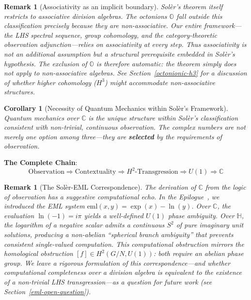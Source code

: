 \documentclass[11pt]{article}
\newtheorem{remark}[theorem]{Remark}
\newtheorem{corollary}[theorem]{Corollary}
\begin{document}
\begin{remark}[Associativity as an implicit boundary]
Sol\`{e}r's theorem itself restricts to associative division algebras. The octonions $\mathbb{O}$ fall outside this classification precisely because they are non-associative. Our entire framework---the LHS spectral sequence, group cohomology, and the category-theoretic observation adjunction---relies on associativity at every step. Thus associativity is not an additional assumption but a structural prerequisite embedded in Sol\`{e}r's hypothesis. The exclusion of $\mathbb{O}$ is therefore automatic: the theorem simply does not apply to non-associative algebras. See Section~\ref{octonionic-h3} for a discussion of whether higher cohomology ($H^3$) might accommodate non-associative structures.
\end{remark}

\begin{corollary}[Necessity of Quantum Mechanics within Sol\`{e}r's Framework]\label{cor:necessity}
Quantum mechanics over $\mathbb{C}$ is the unique structure within Sol\`{e}r's classification consistent with non-trivial, continuous observation. The complex numbers are not merely one option among three---they are \textbf{selected} by the requirements of observation.
\end{corollary}

\textbf{The Complete Chain}:
\[
\boxed{\text{Observation} \Rightarrow \text{Contextuality} \Rightarrow H^2\text{-Transgression} \Rightarrow U(1) \Rightarrow \mathbb{C}}
\]

\begin{remark}[The Sol\`{e}r-EML Correspondence]\label{rem:soler-eml}
The derivation of $\mathbb{C}$ from the logic of observation has a suggestive computational echo. In the Epilogue~\cite{Epilogue}, we introduced the EML system $\text{eml}(x, y) = \exp(x) - \ln(y)$. Over $\mathbb{C}$, the evaluation $\ln(-1) = i\pi$ yields a well-defined $U(1)$ phase ambiguity. Over $\mathbb{H}$, the logarithm of a negative scalar admits a continuous $S^2$ of pure imaginary unit solutions, producing a non-abelian ``spherical branch ambiguity'' that prevents consistent single-valued computation. This computational obstruction mirrors the homological obstruction $[f] \in H^2(G/N, U(1))$: both require an abelian phase group. We leave a rigorous formulation of this correspondence---and whether computational completeness over a division algebra is equivalent to the existence of a non-trivial LHS transgression---as a question for future work (see Section~\ref{eml-open-question}).
\end{remark}
\end{document}
